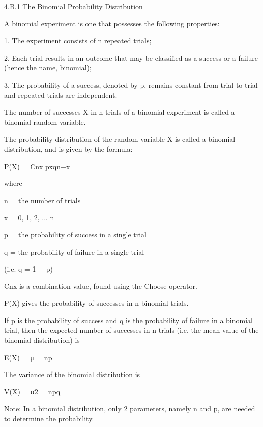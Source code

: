 
4.B.1 The Binomial Probability Distribution

 

A binomial experiment is one that possesses the following properties:

1.   The experiment consists of n repeated trials;

 

2.   Each trial results in an outcome that may be classified as a success or a failure (hence the name, binomial);

 

3.   The probability of a success, denoted by p, remains constant from trial to trial and repeated trials are independent.

The number of successes X in n trials of a binomial experiment is called a binomial random variable.

The probability distribution of the random variable X is called a binomial distribution, and is given by the formula:


P(X) = Cnx pxqn−x

where

n = the number of trials

x = 0, 1, 2, ... n

p = the probability of success in a single trial

q = the probability of failure in a single trial

(i.e. q = 1 − p)

Cnx is a combination value, found using the Choose operator.

 

P(X) gives the probability of successes in n binomial trials.

If p is the probability of success and q is the probability of failure in a binomial trial, then the expected number of successes in n trials (i.e. the mean value of the binomial distribution) is

E(X) = μ = np

The variance of the binomial distribution is

V(X) = σ2 = npq

Note: In a binomial distribution, only 2 parameters, namely n and p, are needed to determine the probability.
 
